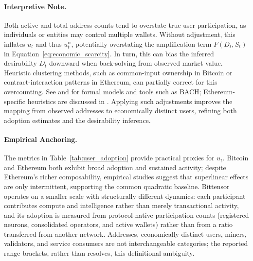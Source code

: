 \documentclass[12pt]{article}
\begin{document}
\vspace{0.5em}
\paragraph{Interpretive Note.}
Both active and total address counts tend to overstate true user participation, as individuals or entities may control multiple wallets. Without adjustment, this inflates \( u_t \) and thus \( u_t^{\alpha} \), potentially overstating the amplification term \( F(D_t,S_t) \) in Equation~\ref{eq:economic_scarcity}. In turn, this can bias the inferred desirability \( D_t \) downward when back-solving from observed market value. Heuristic clustering methods, such as common-input ownership in Bitcoin or contract-interaction patterns in Ethereum, can partially correct for this overcounting. See \citet{he2022address} and \citet{caringella2024bach} for formal models and tools such as BACH; Ethereum-specific heuristics are discussed in \citet{victor2018ethereum}. Applying such adjustments improves the mapping from observed addresses to economically distinct users, refining both adoption estimates and the desirability inference.


\vspace{0.5em}
\paragraph{Empirical Anchoring.}
The metrics in Table~\ref{tab:user_adoption} provide practical proxies for \( u_t \). Bitcoin and Ethereum both exhibit broad adoption and sustained activity; despite Ethereum's richer composability, empirical studies suggest that superlinear effects are only intermittent, supporting the common quadratic baseline. Bittensor operates on a smaller scale with structurally different dynamics: each participant contributes compute and intelligence rather than merely transactional activity, and its adoption is measured from protocol-native participation counts (registered neurons, consolidated operators, and active wallets) rather than from a ratio transferred from another network. Addresses, economically distinct users, miners, validators, and service consumers are not interchangeable categories; the reported range brackets, rather than resolves, this definitional ambiguity.
\end{document}
